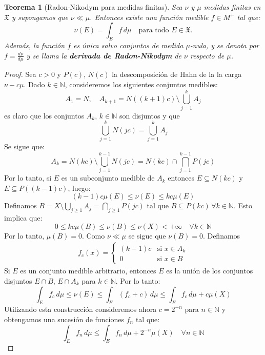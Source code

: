 \documentclass[12pt,a4paper]{article}
\theoremstyle{profesional}
\newtheorem{teorema}{Teorema}[section]
\theoremstyle{definicion-style}
\newcommand{\N}{\mathbb{N}}
\newcommand{\X}{\mathfrak{X}}
\begin{document}
\begin{teorema}[Radon-Nikodym para medidas finitas]
    Sea \( \nu \) y \( \mu \) medidas finitas en \( \X \) y supongamos que \( \nu \ll \mu \). Entonces existe una función medible \( f \in M^+ \) tal que:\[
        \nu(E) = \int_E f \, d\mu \quad \text{para todo } E \in \X.
    \]
    Además, la función \( f \) es única salvo conjuntos de medida \( \mu \)-nula, y se denota por \( f = \frac{d\nu}{d\mu} \) y se llama la \textbf{derivada de Radon-Nikodym} de \( \nu \) respecto de \( \mu \).
\end{teorema}
\begin{proof}
    Sea \( c > 0 \) y \( P(c) \), \( N(c) \) la descomposición de Hahn de la la carga \( \nu - c \mu \). Dado \( k \in \N \), consideremos los siguientes conjuntos medibles:\[
        A_1 = N, \quad A_{k+1} = N\left( (k+1) c \right) \setminus \bigcup_{j = 1}^k A_j
    \]
    es claro que los conjuntos \( A_k \), \( k \in \N \) son disjuntos y que \[
        \bigcup_{j = 1}^k N(jc) = \bigcup_{j = 1}^k A_j
    \]
    Se sigue que:\[
        A_k = N(kc) \setminus \bigcup_{j = 1}^{k-1} N(jc) = N(kc) \cap \bigcap_{j = 1}^{k-1} P(jc)
    \]
    Por lo tanto, si \( E \) es un subconjunto medible de \( A_k \) entonces \( E \subseteq N(kc) \) y \( E \subseteq P((k-1)c) \), luego:\[
        (k-1)c \mu(E) \leq \nu(E) \leq k c \mu(E)
    \]
    Definamos \( B = X \setminus \bigcup_{j \geq 1} A_j = \bigcap_{j \geq 1} P(jc) \) tal que \( B \subseteq P(kc) \, \forall k \in \N \). Esto implica que:\[
        0 \leq k c \mu(B) \leq \nu(B) \leq \nu(X) < +\infty \quad \forall k \in \N
    \]
    Por lo tanto, \( \mu(B) = 0 \). Como \( \nu \ll \mu \) se sigue que \( \nu(B) = 0 \).
    Definamos \begin{align*}
        f_c(x) = \begin{cases}
                     (k-1) c & \text{si } x \in A_k \\
                     0       & \text{si } x \in B
                 \end{cases}
    \end{align*}
    Si \( E \) es un conjunto medible arbitrario, entonces \( E \) es la unión de los conjuntos disjuntos \( E \cap B \), \( E \cap A_k \) para \( k \in \N \). Por lo tanto:\[
        \int_E f_c \, d \mu \leq \nu(E) \leq \int_E (f_c + c) \, d \mu \leq \int_E f_c \, d \mu + c \mu(X)
    \]
    Utilizando esta construcción consideremos ahora \( c = 2^{-n} \) para \( n \in \N \) y obtengamos una sucesión de funciones \( f_n \) tal que:\[
        \int_E f_n \, d \mu \leq \int_E f_n \, d \mu + 2^{-n} \mu(X) \quad \forall n \in \N
\]
\end{proof}
\end{document}
